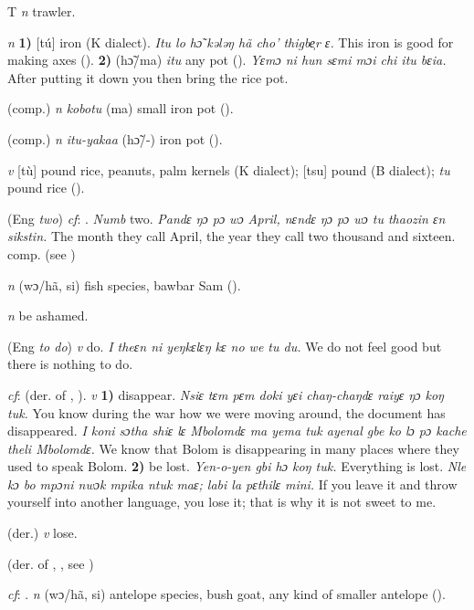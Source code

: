 \begin{letter}{T}
 \textit{n} trawler.

 \textit{n} \textbf{1)} [tú] iron (K dialect). \textit{Itu lo hɔ̃ kələŋ hã cho' thigbe̹r ɛ.} This iron is good for making axes (\citealt{Pichl1967}). \textbf{2)} (hɔ̃/ma) \textit{itu} any pot (\citealt{Pichl1967}). \textit{Yɛmɔ ni hun sɛmi mɔi chi itu bɛia.} After putting it down you then bring the rice pot.

 (comp.) \textit{n} \textit{kobotu} (ma) small iron pot (\citealt{Sumner1921}).

 (comp.) \textit{n}  \textit{itu-yakaa} (hɔ̃/-) iron pot (\citealt{Pichl1967}). 

 \textit{v} [tù] pound rice, peanuts, palm kernels (K dialect); [tsu] pound (B dialect); \textit{tu} pound rice (\citealt{Pichl1967}). 

 (Eng \textit{two}) \textit{cf}: . \textit{Numb} two. \textit{Pandɛ ŋɔ pɔ wɔ April, nɛndɛ ŋɔ pɔ wɔ tu thaozin ɛn sikstin.} The month they call April, the year they call two thousand and sixteen. comp.  (see ) 

 \textit{n} (wɔ/hã, si) fish species, bawbar Sam (\citealt{Pichl1967}). 

 \textit{n} be ashamed.

 (Eng \textit{to do}) \textit{v} do. \textit{I theɛn ni yeŋkɛlɛŋ kɛ no we tu du.} We do not feel good but there is nothing to do.

 \textit{cf}:  (der. of , ). \textit{v} \textbf{1)} disappear. \textit{Nsiɛ tɛm pɛm doki yɛi chaŋ-chaŋdɛ raiyɛ ŋɔ koŋ tuk.} You know during the war how we were moving around, the document has disappeared. \textit{I koni sɔtha shiɛ lɛ Mbolomdɛ ma yema tuk ayenal gbe ko lɔ pɔ kache theli Mbolomdɛ.} We know that Bolom is disappearing in many places where they used to speak Bolom. \textbf{2)} be lost. \textit{Yen-o-yen gbi hɔ koŋ tuk.} Everything is lost. \textit{Nle kɔ bo mpɔni nwɔk mpika ntuk maɛ; labi la pɛthilɛ mini.} If you leave it and throw yourself into another language, you lose it; that is why it is not sweet to me.

 (der.) \textit{v} lose.

 (der. of , , see ) 

 \textit{cf}: . \textit{n} (wɔ/hã, si) antelope species, bush goat, any kind of smaller antelope (\citealt{Pichl1967}). 


\end{letter}

